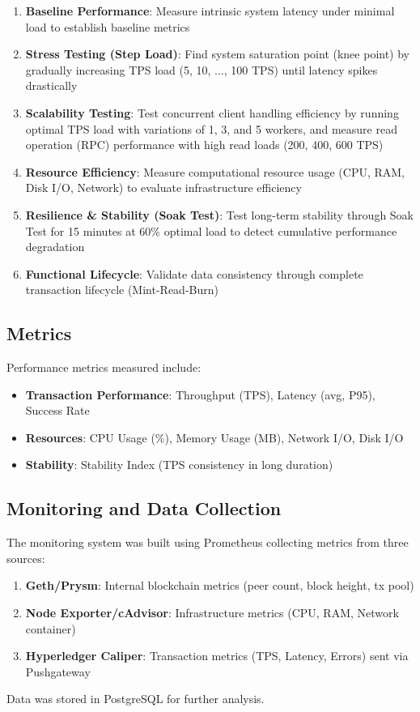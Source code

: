 \documentclass[conference]{IEEEtran}
\begin{document}
\begin{enumerate}
    \item \textbf{Baseline Performance}: Measure intrinsic system latency under minimal load to establish baseline metrics
    \item \textbf{Stress Testing (Step Load)}: Find system saturation point (knee point) by gradually increasing TPS load (5, 10, ..., 100 TPS) until latency spikes drastically
    \item \textbf{Scalability Testing}: Test concurrent client handling efficiency by running optimal TPS load with variations of 1, 3, and 5 workers, and measure read operation (RPC) performance with high read loads (200, 400, 600 TPS)
    \item \textbf{Resource Efficiency}: Measure computational resource usage (CPU, RAM, Disk I/O, Network) to evaluate infrastructure efficiency
    \item \textbf{Resilience \& Stability (Soak Test)}: Test long-term stability through Soak Test for 15 minutes at 60\% optimal load to detect cumulative performance degradation
    \item \textbf{Functional Lifecycle}: Validate data consistency through complete transaction lifecycle (Mint-Read-Burn)
\end{enumerate}

\subsection{Metrics}

Performance metrics measured include:
\begin{itemize}
    \item \textbf{Transaction Performance}: Throughput (TPS), Latency (avg, P95), Success Rate
    \item \textbf{Resources}: CPU Usage (\%), Memory Usage (MB), Network I/O, Disk I/O
    \item \textbf{Stability}: Stability Index (TPS consistency in long duration)
\end{itemize}

\subsection{Monitoring and Data Collection}

The monitoring system was built using Prometheus collecting metrics from three sources:
\begin{enumerate}
    \item \textbf{Geth/Prysm}: Internal blockchain metrics (peer count, block height, tx pool)
    \item \textbf{Node Exporter/cAdvisor}: Infrastructure metrics (CPU, RAM, Network container)
    \item \textbf{Hyperledger Caliper}: Transaction metrics (TPS, Latency, Errors) sent via Pushgateway
\end{enumerate}
Data was stored in PostgreSQL for further analysis.
\end{document}
